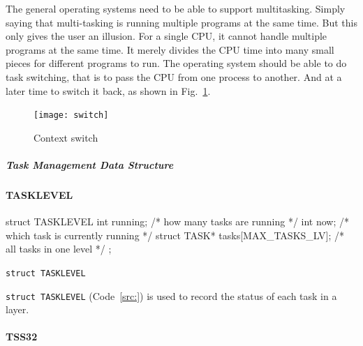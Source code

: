 \documentclass{swfcthesis}
\begin{document}
The general operating systems need to be able to support multitasking. Simply saying that
multi-tasking is running multiple programs at the same time. But this only gives the user
an illusion. For a single CPU, it cannot handle multiple programs at the same time. It
merely divides the CPU time into many small pieces for different programs to run. The
operating system should be able to do task switching, that is to pass the CPU from one
process to another. And at a later time to switch it back, as shown in
Fig.~\ref{fig:ctxt-switch}. 

\begin{figure}
  \centering
  \begin{center}
    \texttt{[image: switch]}
  \end{center}
  \caption{Context switch}
  \label{fig:ctxt-switch}
\end{figure}

\subparagraph{Task Management Data Structure}


\paragraph{TASKLEVEL}

\begin{listing}[H]
  \begin{codeblock}
\begin{ccode}
struct TASKLEVEL
{ 
  int running;                      /* how many tasks are running */
  int now;                          /* which task is currently running */
  struct TASK* tasks[MAX_TASKS_LV]; /* all tasks in one level */
};
\end{ccode}
  \end{codeblock}
  \caption{\texttt{struct TASKLEVEL}}\label{src:TASKLEVEL}
\end{listing}

\texttt{struct TASKLEVEL} (Code~\ref{src:}) is used to record the status of each task in a
layer.


\paragraph{TSS32}
\end{document}
